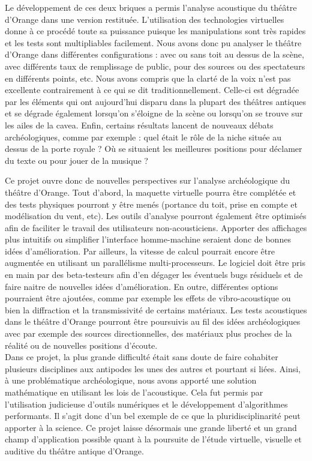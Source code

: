 Le développement de ces deux briques a permis l'analyse acoustique du théâtre d'Orange dans une version restituée. L'utilisation des technologies virtuelles donne à ce procédé toute sa puissance puisque les manipulations sont très rapides et les tests sont multipliables facilement. Nous avons donc pu analyser le théâtre d'Orange dans différentes configurations : avec ou sans toit au dessus de la scène, avec différents taux de remplissage de public, pour des sources ou des spectateurs en différents points, etc. Nous avons compris que la clarté de la voix n'est pas excellente contrairement à ce qui se dit traditionnellement. Celle-ci est dégradée par les éléments qui ont aujourd'hui disparu dans la plupart des théâtres antiques et se dégrade également lorsqu'on s'éloigne de la scène ou lorsqu'on se trouve sur les ailes de la \gls{cavea}. Enfin, certains résultats lancent de nouveaux débats archéologiques, comme par exemple : quel était le rôle de la niche située au dessus de la porte royale ? Où se situaient les meilleures positions pour déclamer du texte ou pour jouer de la musique ?

Ce projet ouvre donc de nouvelles perspectives sur l'analyse archéologique du théâtre d'Orange. Tout d'abord, la maquette virtuelle pourra être complétée et des tests physiques pourront y être menés (portance du toit, prise en compte et modélisation du vent, etc). Les outils d'analyse pourront également être optimisés afin de faciliter le travail des utilisateurs non-acousticiens. Apporter des affichages plus intuitifs \cite[]{immersive} ou simplifier l'interface homme-machine seraient donc de bonnes idées d'amélioration. Par ailleurs, la vitesse de calcul pourrait encore être augmentée en utilisant un parallélisme multi-processeurs. Le logiciel doit être pris en main par des beta-testeurs afin d'en dégager les éventuels bugs résiduels et de faire naitre de nouvelles idées d'amélioration. En outre, différentes options pourraient être ajoutées, comme par exemple les effets de vibro-acoustique ou bien la diffraction et la transmissivité de certains matériaux. Les tests acoustiques dans le théâtre d'Orange pourront être poursuivis au fil des idées archéologiques avec par exemple des sources directionnelles, des matériaux plus proches de la réalité ou de nouvelles positions d'écoute. \\

Dans ce projet, la plus grande difficulté était sans doute de faire cohabiter plusieurs disciplines aux antipodes les unes des autres et pourtant si liées. Ainsi, à une problématique archéologique, nous avons apporté une solution mathématique en utilisant les lois de l'acoustique. Cela fut permis par l'utilisation judicieuse d'outils numériques et le développement d'algorithmes performants. Il s'agit donc d'un bel exemple de ce que la pluridisciplinarité peut apporter à la science. Ce projet laisse désormais une grande liberté et un grand champ d'application possible quant à la poursuite de l'étude virtuelle, visuelle et auditive du théâtre antique d'Orange.

 
 
